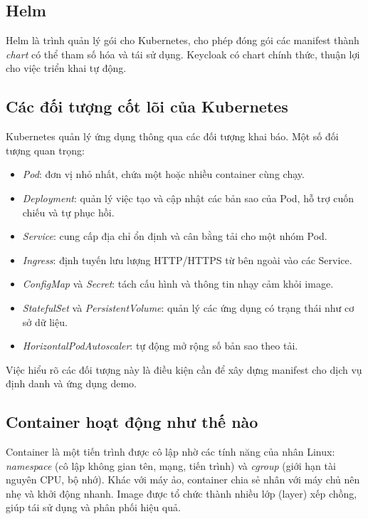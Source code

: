 \subsection{Helm}

Helm là trình quản lý gói cho Kubernetes, cho phép đóng gói các manifest
thành \textit{chart} có thể tham số hóa và tái sử dụng. Keycloak có chart chính
thức, thuận lợi cho việc triển khai tự động.

\subsection{Các đối tượng cốt lõi của Kubernetes}
\label{subsec:k8s-obj}

Kubernetes quản lý ứng dụng thông qua các đối tượng khai báo. Một số đối tượng
quan trọng:

\begin{itemize}
  \item \textit{Pod}: đơn vị nhỏ nhất, chứa một hoặc nhiều container cùng chạy.
  \item \textit{Deployment}: quản lý việc tạo và cập nhật các bản sao của Pod,
  hỗ trợ cuốn chiếu và tự phục hồi.
  \item \textit{Service}: cung cấp địa chỉ ổn định và cân bằng tải cho một nhóm
  Pod.
  \item \textit{Ingress}: định tuyến lưu lượng HTTP/HTTPS từ bên ngoài vào các
  Service.
  \item \textit{ConfigMap} và \textit{Secret}: tách cấu hình và thông tin nhạy
  cảm khỏi image.
  \item \textit{StatefulSet} và \textit{PersistentVolume}: quản lý các ứng dụng
  có trạng thái như cơ sở dữ liệu.
  \item \textit{HorizontalPodAutoscaler}: tự động mở rộng số bản sao theo tải.
\end{itemize}

Việc hiểu rõ các đối tượng này là điều kiện cần để xây dựng manifest cho dịch
vụ định danh và ứng dụng demo.

\subsection{Container hoạt động như thế nào}
\label{subsec:container}

Container là một tiến trình được cô lập nhờ các tính năng của nhân Linux:
\textit{namespace} (cô lập không gian tên, mạng, tiến trình) và \textit{cgroup}
(giới hạn tài nguyên CPU, bộ nhớ). Khác với máy ảo, container chia sẻ nhân với
máy chủ nên nhẹ và khởi động nhanh. Image được tổ chức thành nhiều lớp (layer)
xếp chồng, giúp tái sử dụng và phân phối hiệu quả.

